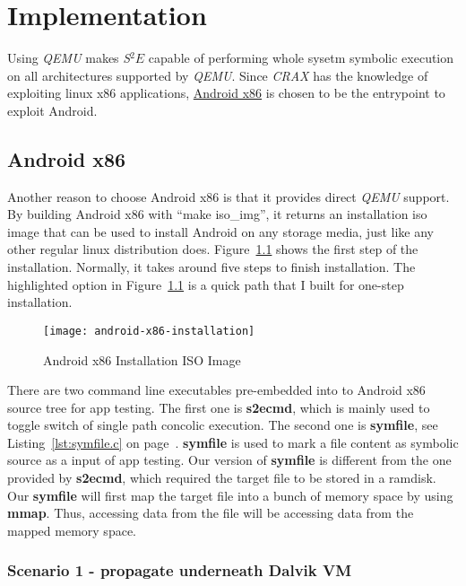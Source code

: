 \chapter{Implementation}

Using \emph{QEMU} makes \emph{S$^{2}E$} capable of performing whole sysetm
symbolic execution on all architectures supported by \emph{QEMU}. Since
\emph{CRAX} has the knowledge of exploiting linux x86 applications,
\href{http://www.android-x86.org/}{Android x86} is chosen to be the entrypoint
to exploit Android.

\section{Android x86}

Another reason to choose Android x86 is that it provides direct \emph{QEMU}
support. By building Android x86 with ``make iso\_img'', it returns an
installation iso image that can be used to install Android on any storage
media, just like any other regular linux distribution does.
Figure~\ref{fig:android-x86-installation} shows the first step of the
installation. Normally, it takes around five steps to finish installation. The
highlighted option in Figure~\ref{fig:android-x86-installation} is a quick path
that I built for one-step installation.

\begin{figure}[!ht]
  \texttt{[image: android-x86-installation]}
  \caption{Android x86 Installation ISO Image}
  \label{fig:android-x86-installation}
\end{figure}

There are two command line executables pre-embedded into to Android x86 source
tree for app testing. The first one is \textbf{s2ecmd}, which is mainly used to
toggle switch of single path concolic execution. The second one is
\textbf{symfile}, see Listing~\ref{lst:symfile.c} on
page~\pageref{lst:symfile.c}. \textbf{symfile} is used to mark a file content
as symbolic source as a input of app testing. Our version of \textbf{symfile}
is different from the one provided by \textbf{s2ecmd}, which required the
target file to be stored in a ramdisk. Our \textbf{symfile} will first map the
target file into a bunch of memory space by using \textbf{mmap}. Thus,
accessing data from the file will be accessing data from the mapped memory
space.

\subsection{Scenario 1 - propagate underneath Dalvik VM}

